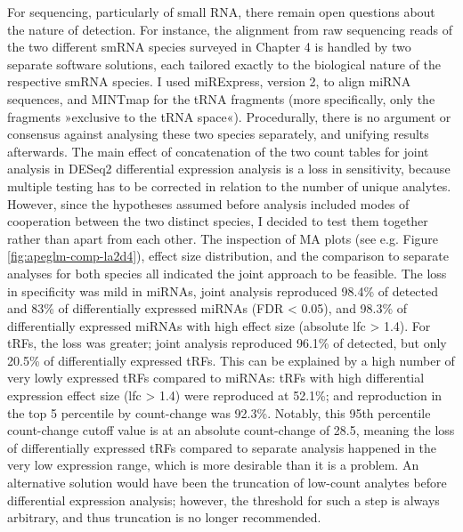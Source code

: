 For sequencing, particularly of small RNA, there remain open questions about the nature of detection. For instance, the alignment from raw sequencing reads of the two different smRNA species surveyed in Chapter 4 is handled by two separate software solutions, each tailored exactly to the biological nature of the respective smRNA species. I used miRExpress, version 2,\cite{Wang2009} to align miRNA sequences, and MINTmap\cite{Loher2017} for the tRNA fragments (more specifically, only the fragments »exclusive to the tRNA space«). Procedurally, there is no argument or consensus against analysing these two species separately, and unifying results afterwards. The main effect of concatenation of the two count tables for joint analysis in DESeq2 differential expression analysis is a loss in sensitivity, because multiple testing has to be corrected in relation to the number of unique analytes. However, since the hypotheses assumed before analysis included modes of cooperation between the two distinct species, I decided to test them together rather than apart from each other. The inspection of MA plots (see e.g. Figure \ref{fig:apeglm-comp-la2d4}), effect size distribution, and the comparison to separate analyses for both species all indicated the joint approach to be feasible. The loss in specificity was mild in miRNAs, joint analysis reproduced 98.4\% of detected and 83\% of differentially expressed miRNAs (FDR < 0.05), and 98.3\% of differentially expressed miRNAs with high effect size (absolute \ac{lfc} > 1.4). For tRFs, the loss was greater; joint analysis reproduced 96.1\% of detected, but only 20.5\% of differentially expressed tRFs. This can be explained by a high number of very lowly expressed tRFs compared to miRNAs: tRFs with high differential expression effect size (\ac{lfc} > 1.4) were reproduced at 52.1\%; and reproduction in the top 5 percentile by count-change was 92.3\%. Notably, this 95th percentile count-change cutoff value is at an absolute count-change of 28.5, meaning the loss of differentially expressed tRFs compared to separate analysis happened in the very low expression range, which is more desirable than it is a problem. An alternative solution would have been the truncation of low-count analytes before differential expression analysis; however, the threshold for such a step is always arbitrary, and thus truncation is no longer recommended.\cite{Zhu2019}

